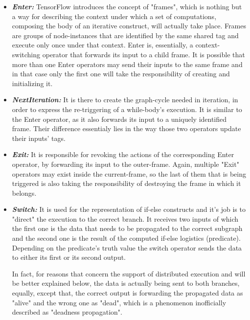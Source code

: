 \documentclass[ack,preface]{dithesis}
\begin{document}
    \begin{itemize}

    \item \textit{\textbf{Enter:}} TensorFlow introduces the concept of "frames", which is nothing but a way for describing the context under which a set of computations, composing the body of an iterative construct, will actually take place. Frames are groups of node-instances that are identified by the same shared tag and execute only once under that context. Enter is, essentially, a context-switching operator that forwards its input to a child frame. It is possible that more than one Enter operators may send their inputs to the same frame and in that case only the first one will take the responsibility of creating and initializing it.

    \item \textit{\textbf{NextIteration:}} It is there to create the graph-cycle needed in iteration, in order to express the re-triggering of a while-body's execution. It is similar to the Enter operator, as it also forwards its input to a uniquely identified frame. Their difference essentialy lies in the way those two operators update their inputs' tags.

    \item \textit{\textbf{Exit:}} It  is responsible for revoking the actions of the corresponding Enter operator, by forwarding its input to the outer-frame.
 Again, multiple "Exit" operators may exist inside the current-frame, so the last of them that is being triggered is also taking the responsibility of destroying the frame in which it belongs.

    \item \textit{\textbf{Switch:}} It is used for the representation of if-else constructs and it's job is to "direct" the execution to the correct branch. It receives two inputs of which the first one is the data that needs to be propagated to the correct subgraph and the second one is the result of the computed if-else logistics  (predicate). Depending on the predicate's truth value the switch operator sends the data to either its first or its second output. 

In fact, for reasons that concern the support of distributed execution and will be better explained below,  the data is actually being sent to both branches, equally, 
except that, the correct output is forwarding the propagated data as "alive" and the wrong one as "dead", which is a phenomenon inofficially described as "deadness propagation".


\end{itemize}
\end{document}
